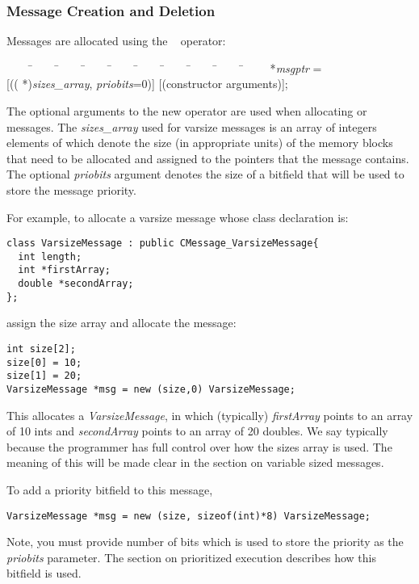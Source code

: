 \subsubsection{Message Creation and Deletion}
\label{memory allocation}

Messages are allocated using the \CC\ 
operator:

\begin{tabbing}
~~~~ \=~~~~ \=~~~~ \=~~~~ \=~~~~ \=~~~~ \=~~~~ \=~~~~ \=~~~~ \=~~~~ \kill
\>  *{\it msgptr} = \\
\> \>  [(( *){\it sizes\_array},  {\it priobits}=0)] 
[(constructor arguments)]; \\
\end{tabbing}

The optional arguments to the new operator are used when allocating 
 or  messages. The {\it sizes\_array} 
used for varsize messages is an 
array of integers elements of which denote the size (in appropriate
units) of the memory blocks that need to be allocated and assigned to the
pointers that the message contains. The optional {\it priobits} argument 
denotes the size of a bitfield that will be used to store the message 
priority.

For example, to allocate a varsize message whose 
class declaration is:

\begin{verbatim}
class VarsizeMessage : public CMessage_VarsizeMessage{
  int length;
  int *firstArray;
  double *secondArray;
};
\end{verbatim}

assign the size array and allocate the message:
\begin{verbatim}
int size[2];
size[0] = 10;
size[1] = 20;
VarsizeMessage *msg = new (size,0) VarsizeMessage;
\end{verbatim}

This allocates a {\it VarsizeMessage}, in which (typically) {\it firstArray}
points to an array of 10 ints and {\it secondArray} points to an array
of 20 doubles. We say typically because the programmer has full control over 
how the sizes array is used. The meaning of this will be made clear in the 
section on variable sized messages.


To add a priority bitfield to this message, 
\begin{verbatim}
VarsizeMessage *msg = new (size, sizeof(int)*8) VarsizeMessage;
\end{verbatim}
Note, you must provide number of bits which is used to store the priority as 
the {\it priobits} parameter. The section on prioritized execution describes
how this bitfield is used.

